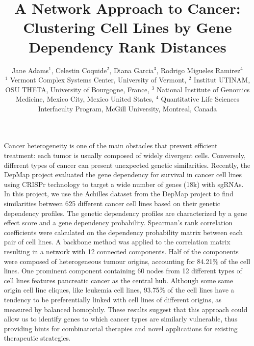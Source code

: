 \documentclass[12pt]{article}
\begin{document}
\title{\normalsize\bf \vspace{-10ex}
A Network Approach to Cancer: Clustering Cell Lines by Gene Dependency Rank Distances}

\begingroup\onehalfspacing
\author{Jane Adams$^1$, Celestin Coquide$^2$, Diana Garcia$^3$, Rodrigo Migueles Ramirez$^4$ \\
\footnotesize
$^1$ Vermont Complex Systems Center, University of Vermont, $^2$ Institut UTINAM, OSU THETA, University of Bourgogne, France, $^3$ National Institute of Genomics Medicine, Mexico City, Mexico  United States,  $^4$ Quantitative Life Sciences Interfaculty Program, McGill University, Montreal, Canada }
\endgroup



\date{\vspace{-5ex}} %

\maketitle

\thispagestyle{empty}
\pagestyle{empty}
Cancer heterogeneity is one of the main obstacles that prevent efficient treatment: each tumor is usually composed of widely divergent cells. Conversely, different types of cancer can present unexpected genetic similarities. Recently, the DepMap project \cite{Tsherniak17} evaluated the gene dependency for survival in cancer cell lines using CRISPr technology to target a wide number of genes (18k) with sgRNAs. In this project, we use the Achilles dataset from the DepMap project to find similarities between 625 different cancer cell lines based on their genetic dependency profiles. The genetic dependency profiles are characterized by a gene effect score and a gene dependency probability. Spearman’s rank correlation coefficients were calculated on the dependency probability matrix between each pair of cell lines. A backbone method  \cite{Serrano09} was applied to the correlation matrix resulting in a network with 12 connected components. Half of the components were composed of heterogeneous tumour origins, accounting for 84.21$\%$ of the cell lines. One prominent component containing 60 nodes from 12 different types of cell lines features pancreatic cancer as the central hub. Although some same origin cell line cliques, like leukemia cell lines, 93.75$\%$ of the cell lines have a tendency to be preferentially linked with cell lines of different origins, as measured by balanced homophily. These results suggest that this approach could allow us to identify genes to which cancer types are similarly vulnerable, thus providing hints for combinatorial therapies and novel applications for existing therapeutic strategies. 
\end{document}
